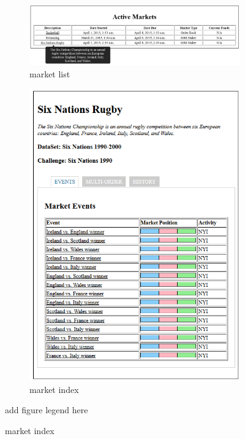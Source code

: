 \documentclass[bsc,frontabs,twoside,singlespacing,parskip,deptreport]{infthesis}     %
\begin{document}
\begin{figure}
\caption{Market list and market index}

\begin{subfigure}{1\textwidth}

  \includegraphics[width=1\linewidth]{figures/ui-market-list(c).png}
  \caption{market list}
  \label{fig:ui-market-list}
\end{subfigure}%

\begin{subfigure}{0.6\textwidth}
\includegraphics[width=1\linewidth]{figures/ui-market-index(c).png}
  \caption{market index}
  \label{fig:ui_market_index}
\end{subfigure}
\label{fig:market-list-index}

{add figure legend here}
\end{figure}
\end{document}
